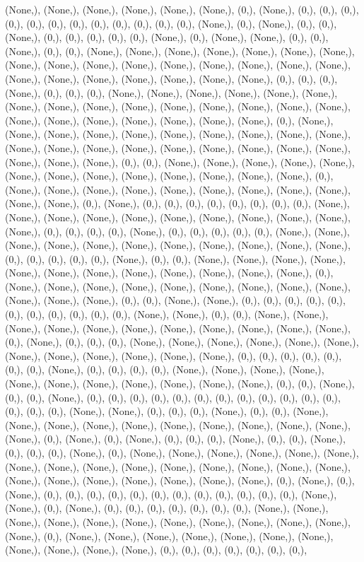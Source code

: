 \documentclass{article}
\begin{document}
(None,), (None,), (None,), (None,), (None,), (None,), (0,), (None,), (0,), (0,), (0,), (0,), (0,), (0,), (0,), (0,), (0,), (0,), (0,), (0,), (None,), (0,), (None,), (0,), (0,), (None,), (0,), (0,), (0,), (0,), (0,), (None,), (0,), (None,), (None,), (0,), (0,), (None,), (0,), (0,), (None,), (None,), (None,), (None,), (None,), (None,), (None,), (None,), (None,), (None,), (None,), (None,), (None,), (None,), (None,), (None,), (None,), (None,), (None,), (None,), (None,), (None,), (None,), (0,), (0,), (0,), (None,), (0,), (0,), (0,), (None,), (None,), (None,), (None,), (None,), (None,), (None,), (None,), (None,), (None,), (None,), (None,), (None,), (None,), (None,), (None,), (None,), (None,), (None,), (None,), (None,), (None,), (0,), (None,), (None,), (None,), (None,), (None,), (None,), (None,), (None,), (None,), (None,), (None,), (None,), (None,), (None,), (None,), (None,), (None,), (None,), (None,), (None,), (None,), (None,), (0,), (0,), (None,), (None,), (None,), (None,), (None,), (None,), (None,), (None,), (None,), (None,), (None,), (None,), (None,), (0,), (None,), (None,), (None,), (None,), (None,), (None,), (None,), (None,), (None,), (None,), (None,), (0,), (None,), (0,), (0,), (0,), (0,), (0,), (0,), (0,), (0,), (None,), (None,), (None,), (None,), (None,), (None,), (None,), (None,), (None,), (None,), (None,), (0,), (0,), (0,), (0,), (None,), (0,), (0,), (0,), (0,), (0,), (None,), (None,), (None,), (None,), (None,), (None,), (None,), (None,), (None,), (None,), (None,), (0,), (0,), (0,), (0,), (0,), (None,), (0,), (0,), (None,), (None,), (None,), (None,), (None,), (None,), (None,), (None,), (None,), (None,), (None,), (None,), (0,), (None,), (None,), (None,), (None,), (None,), (None,), (None,), (None,), (None,), (None,), (None,), (None,), (0,), (0,), (None,), (None,), (0,), (0,), (0,), (0,), (0,), (0,), (0,), (0,), (0,), (0,), (0,), (None,), (None,), (0,), (0,), (None,), (None,), (None,), (None,), (None,), (None,), (None,), (None,), (None,), (None,), (None,), (0,), (None,), (0,), (0,), (0,), (None,), (None,), (None,), (None,), (None,), (None,), (None,), (None,), (None,), (None,), (None,), (None,), (0,), (0,), (0,), (0,), (0,), (0,), (0,), (None,), (0,), (0,), (0,), (0,), (None,), (None,), (None,), (None,), (None,), (None,), (None,), (None,), (None,), (None,), (None,), (0,), (0,), (None,), (0,), (0,), (None,), (0,), (0,), (0,), (0,), (0,), (0,), (0,), (0,), (0,), (0,), (0,), (0,), (0,), (0,), (0,), (None,), (None,), (0,), (0,), (0,), (None,), (0,), (0,), (None,), (None,), (None,), (None,), (None,), (None,), (None,), (None,), (None,), (None,), (None,), (0,), (None,), (0,), (None,), (0,), (0,), (0,), (None,), (0,), (0,), (None,), (0,), (0,), (0,), (None,), (0,), (None,), (None,), (None,), (None,), (None,), (None,), (None,), (None,), (None,), (None,), (None,), (None,), (None,), (None,), (None,), (None,), (None,), (None,), (None,), (None,), (None,), (None,), (0,), (None,), (0,), (None,), (0,), (0,), (0,), (0,), (0,), (0,), (0,), (0,), (0,), (0,), (0,), (0,), (None,), (None,), (0,), (None,), (0,), (0,), (0,), (0,), (0,), (0,), (0,), (None,), (None,), (None,), (None,), (None,), (None,), (None,), (None,), (None,), (None,), (None,), (None,), (0,), (None,), (None,), (None,), (None,), (None,), (None,), (None,), (None,), (None,), (None,), (None,), (0,), (0,), (0,), (0,), (0,), (0,), (0,), 
\end{document}
